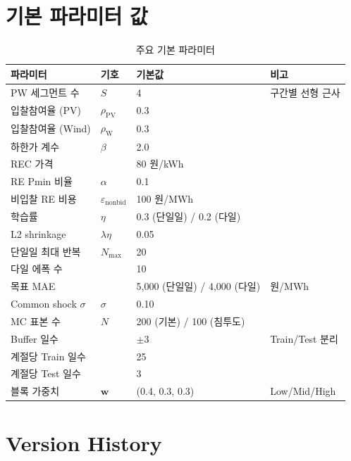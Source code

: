 \documentclass[11pt, a4paper]{article}
\begin{document}
\section{기본 파라미터 값}\label{app:default_params}

\begin{table}[H]
\centering
\caption{주요 기본 파라미터}\label{tab:default_params}
\small
\begin{tabular}{llll}
\toprule
\textbf{파라미터} & \textbf{기호} & \textbf{기본값} & \textbf{비고} \\
\midrule
PW 세그먼트 수 & $S$ & 4 & 구간별 선형 근사 \\
입찰참여율 (PV) & $\rho_{\text{PV}}$ & 0.3 & \\
입찰참여율 (Wind) & $\rho_{\text{W}}$ & 0.3 & \\
하한가 계수 & $\beta$ & 2.0 & \\
REC 가격 & & 80 원/kWh & \\
RE Pmin 비율 & $\alpha$ & 0.1 & \\
비입찰 RE 비용 & $\varepsilon_{\text{nonbid}}$ & 100 원/MWh & \\
학습률 & $\eta$ & 0.3 (단일일) / 0.2 (다일) & \\
L2 shrinkage & $\lambda\eta$ & 0.05 & \\
단일일 최대 반복 & $N_{\max}$ & 20 & \\
다일 에폭 수 & & 10 & \\
목표 MAE & & 5,000 (단일일) / 4,000 (다일) & 원/MWh \\
Common shock $\sigma$ & $\sigma$ & 0.10 & \\
MC 표본 수 & $N$ & 200 (기본) / 100 (침투도) & \\
Buffer 일수 & & $\pm 3$ & Train/Test 분리 \\
계절당 Train 일수 & & 25 & \\
계절당 Test 일수 & & 3 & \\
블록 가중치 & $\bm{w}$ & (0.4, 0.3, 0.3) & Low/Mid/High \\
\bottomrule
\end{tabular}
\end{table}


\section{Version History}\label{app:changelog}
\end{document}

